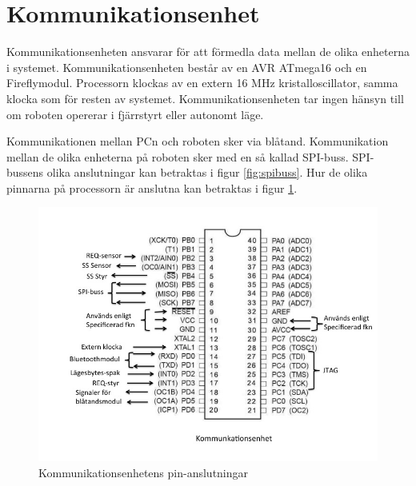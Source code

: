 %

\section{Kommunikationsenhet}

Kommunikationsenheten ansvarar för att förmedla data mellan de olika 
enheterna i systemet. Kommunikationsenheten består av en AVR ATmega16 och en 
Fireflymodul. Processorn klockas av en extern 16 MHz kristalloscillator, samma klocka som för 
resten av systemet. Kommunikationsenheten tar ingen hänsyn till om roboten 
opererar i fjärrstyrt eller autonomt läge.

Kommunikationen mellan PCn och roboten sker via blåtand. Kommunikation mellan 
de olika enheterna på roboten sker med en så kallad SPI-buss. SPI-bussens 
olika anslutningar kan betraktas i figur \ref{fig:spibuss}. Hur de olika 
pinnarna på processorn är anslutna kan betraktas i figur \ref{fig:PINkomm}.

\begin{figure}[H]
  \centering
 \includegraphics[angle=0,scale=0.5]{bilder/PIN_komm.jpg}
  \caption{Kommunikationsenhetens pin-anslutningar}
  \label{fig:PINkomm}
\end{figure}

